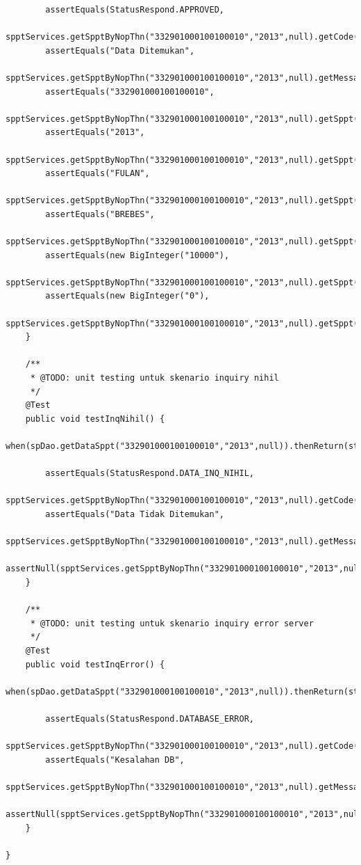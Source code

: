 \documentclass[pdftex,12pt, oneside]{article}
\begin{document}
\begin{enumerate}[A.]
\begin{enumerate}[1.]
\begin{lstlisting}
        assertEquals(StatusRespond.APPROVED,
                spptServices.getSpptByNopThn("332901000100100010","2013",null).getCode());
        assertEquals("Data Ditemukan",
                spptServices.getSpptByNopThn("332901000100100010","2013",null).getMessage());
        assertEquals("332901000100100010",
                spptServices.getSpptByNopThn("332901000100100010","2013",null).getSppt().getNop());
        assertEquals("2013",
                spptServices.getSpptByNopThn("332901000100100010","2013",null).getSppt().getThn());
        assertEquals("FULAN",
                spptServices.getSpptByNopThn("332901000100100010","2013",null).getSppt().getNama());
        assertEquals("BREBES",
                spptServices.getSpptByNopThn("332901000100100010","2013",null).getSppt().getAlamatOp());
        assertEquals(new BigInteger("10000"),
                spptServices.getSpptByNopThn("332901000100100010","2013",null).getSppt().getPokok());
        assertEquals(new BigInteger("0"),
                spptServices.getSpptByNopThn("332901000100100010","2013",null).getSppt().getDenda());
    }

    /**
     * @TODO: unit testing untuk skenario inquiry nihil
     */
    @Test
    public void testInqNihil() {
        when(spDao.getDataSppt("332901000100100010","2013",null)).thenReturn(statusInqGagalDataTidakAda);

        assertEquals(StatusRespond.DATA_INQ_NIHIL,
                spptServices.getSpptByNopThn("332901000100100010","2013",null).getCode());
        assertEquals("Data Tidak Ditemukan",
                spptServices.getSpptByNopThn("332901000100100010","2013",null).getMessage());
        assertNull(spptServices.getSpptByNopThn("332901000100100010","2013",null).getSppt());
    }

    /**
     * @TODO: unit testing untuk skenario inquiry error server
     */
    @Test
    public void testInqError() {
        when(spDao.getDataSppt("332901000100100010","2013",null)).thenReturn(statusInqError);

        assertEquals(StatusRespond.DATABASE_ERROR,
                spptServices.getSpptByNopThn("332901000100100010","2013",null).getCode());
        assertEquals("Kesalahan DB",
                spptServices.getSpptByNopThn("332901000100100010","2013",null).getMessage());
        assertNull(spptServices.getSpptByNopThn("332901000100100010","2013",null).getSppt());
    }

}
    \end{lstlisting}
    

\end{enumerate}
\end{enumerate}
\end{document}
